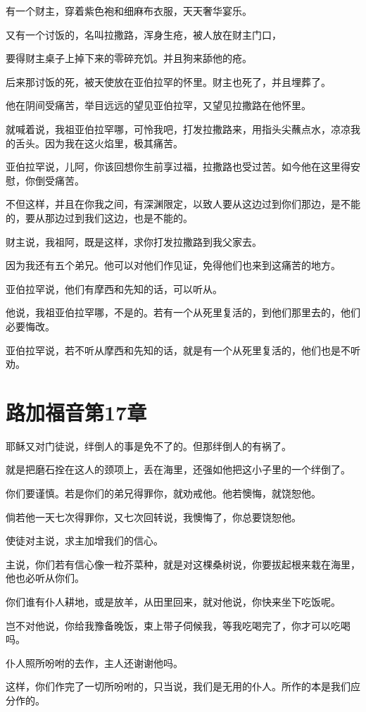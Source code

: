 \documentclass[12pt,oneside]{book}
\begin{document}
有一个财主，穿着紫色袍和细麻布衣服，天天奢华宴乐。

又有一个讨饭的，名叫拉撒路，浑身生疮，被人放在财主门口，

要得财主桌子上掉下来的零碎充饥。并且狗来舔他的疮。

后来那讨饭的死，被天使放在亚伯拉罕的怀里。财主也死了，并且埋葬了。

他在阴间受痛苦，举目远远的望见亚伯拉罕，又望见拉撒路在他怀里。

就喊着说，我祖亚伯拉罕哪，可怜我吧，打发拉撒路来，用指头尖蘸点水，凉凉我的舌头。因为我在这火焰里，极其痛苦。

亚伯拉罕说，儿阿，你该回想你生前享过福，拉撒路也受过苦。如今他在这里得安慰，你倒受痛苦。

不但这样，并且在你我之间，有深渊限定，以致人要从这边过到你们那边，是不能的，要从那边过到我们这边，也是不能的。

财主说，我祖阿，既是这样，求你打发拉撒路到我父家去。

因为我还有五个弟兄。他可以对他们作见证，免得他们也来到这痛苦的地方。

亚伯拉罕说，他们有摩西和先知的话，可以听从。

他说，我祖亚伯拉罕哪，不是的。若有一个从死里复活的，到他们那里去的，他们必要悔改。

亚伯拉罕说，若不听从摩西和先知的话，就是有一个从死里复活的，他们也是不听劝。

\chapter{路加福音第17章}
耶稣又对门徒说，绊倒人的事是免不了的。但那绊倒人的有祸了。

就是把磨石拴在这人的颈项上，丢在海里，还强如他把这小子里的一个绊倒了。

你们要谨慎。若是你们的弟兄得罪你，就劝戒他。他若懊悔，就饶恕他。

倘若他一天七次得罪你，又七次回转说，我懊悔了，你总要饶恕他。

使徒对主说，求主加增我们的信心。

主说，你们若有信心像一粒芥菜种，就是对这棵桑树说，你要拔起根来栽在海里，他也必听从你们。

你们谁有仆人耕地，或是放羊，从田里回来，就对他说，你快来坐下吃饭呢。

岂不对他说，你给我豫备晚饭，束上带子伺候我，等我吃喝完了，你才可以吃喝吗。

仆人照所吩咐的去作，主人还谢谢他吗。

这样，你们作完了一切所吩咐的，只当说，我们是无用的仆人。所作的本是我们应分作的。
\end{document}
